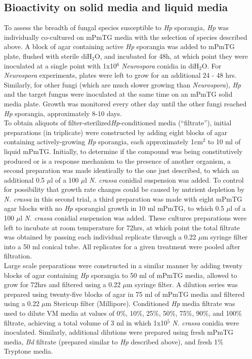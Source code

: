 \subsection*{Bioactivity on solid media and liquid media}
To assess the breadth of fungal species susceptible to \textit{Hp} sporangia, \textit{Hp} was individually co-cultured on mPmTG media with the selection of species described above. A block of agar containing active \textit{Hp} sporangia was added to mPmTG plate, flushed with sterile diH$_{2}$O, and incubated for 48h, at which point they were inoculated at a single point with 1x10$^{6}$ \textit{Neurospora} conidia in diH$_{2}$O. For \textit{Neurospora} experiments, plates were left to grow for an additional 24 - 48 hrs.\\
\indent Similarly, for other fungi (which are much slower growing than \textit{Neurospora}), \textit{Hp} and the target fungus were inoculated at the same time on an mPmTG solid media plate. Growth was monitored every other day until the other fungi reached \textit{Hp} sporangia, approximately 8-10 days.\\
\indent To obtain aliquots of filter-sterilized\textit{Hp}-conditioned media (\enquote{filtrate}), initial preparations (in triplicate) were constructed by adding eight blocks of agar containing actively-growing \textit{Hp} sporangia, each approximately 1cm$^{2}$ to 10 ml of liquid mPmTG. Initially, to determine if the compound was being constitutively produced or is a response mechanism to the presence of another organism, a second preparation was made identically to the one just described, to which an additional 0.5 $\mu$l of a 100 $\mu$l  \textit{N. crassa} conidial suspension was added. To control for possibility that growth rate changes could be caused by nutrient depletion by \textit{N. crassa} in this second trial, a third preparation was made with eight mPmTG agar blocks with no \textit{Hp} sporangial growth in 10 ml mPmTG, to which 0.5 $\mu$l of a 100 $\mu$l \textit{N. crassa} conidial suspension was added. These cultures preparations were left to incubate at room temperature for 72hrs, at which point the total filtrate was obtained by passing each individual replicate through a 0.22 $\mu$m syringe filter into a 50 ml conical tube. All replicates for a given treatment were pooled after filtration. \\
\indent Large scale preparations were constructed in a similar manner by adding twenty blocks of agar containing \textit{Hp} sporangia to 50 ml of mPmTG media, allowed to grow for 72hrs and filtered using a 0.22 $\mu$m syringe filter. A dilution series was prepared using twenty-five blocks of agar in 75 ml of mPmTG media and filtered using a 0.22 $\mu$m Stericup filter (Millipore). Conditioned \textit{Hp} media filtrate was used to dilute VM media at values of 0\%, 10\%, 25\%, 50\%, 75\%, 90\%, and 100\% filtrate, achieving a total volume of 3 ml in which 1x10$^{5}$ \textit{N. crassa} conidia were inoculated. Similarly, additional dilutions were prepared using fresh mPmTG media, \textit{Bd} filtrate (prepared similar to \textit{Hp} described above), and fresh 1\% Tryptone media.\\
